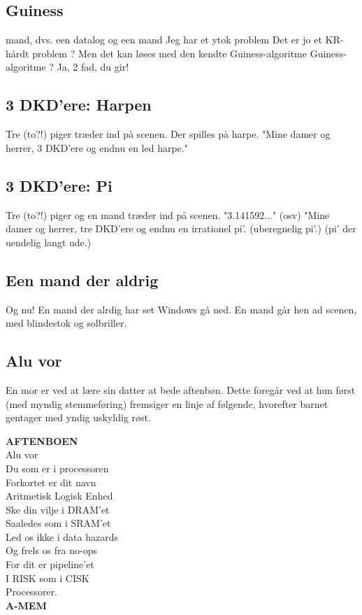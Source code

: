\documentclass[danish]{article}
\begin{document}
\begin{sketch}
\subsection*{Guiness}
 mand, dvs. een datalog og een mand
 Jeg har et ytok problem
 Det er jo et KR-hårdt problem
 ?
 Men det kan løses med den kendte Guiness-algoritme
 Guiness-algoritme ?
 Ja, 2 fad, du gir!

\subsection*{3 DKD'ere: Harpen}
\scene Tre (to?!) piger træder ind på scenen. Der spilles på harpe.
 "Mine damer og herrer, 3 DKD'ere og endnu en led
harpe."

\subsection*{3 DKD'ere: Pi}
\scene Tre (to?!) piger og en mand træder ind på scenen.
 "3.141592..." (osv)
 "Mine damer og herrer, tre DKD'ere og endnu en irrationel pi'.
 (uberegnelig pi'.) (pi' der uendelig langt ude.)


\subsection*{Een mand der aldrig}
 Og nu! En mand der alrdig har set Windows gå ned.
\scene En mand går hen ad scenen, med blindestok og solbriller.

\subsection*{Alu vor}
En mor er ved at lære sin datter at bede aftenbøn. Dette foregår ved at
hun først (med myndig stemmeføring) fremsiger en linje af følgende,
hvorefter barnet gentager med yndig uskyldig røst. 

\textbf{AFTENBOEN}\\
Alu vor\\
Du som er i processoren\\
Forkortet er dit navn\\
Aritmetisk Logisk Enhed\\
Ske din vilje i DRAM'et\\
Saaledes som i SRAM'et\\
Led os ikke i data hazards\\
Og frels os fra no-ops\\
For dit er pipeline'et\\
I RISK som i CISK\\
Processorer.\\

\textbf{A-MEM}

\end{sketch}
\end{document}
